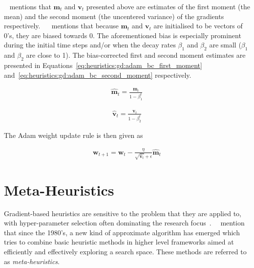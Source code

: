 \citeauthor{ref:ruder:2016}~\cite{ref:ruder:2016} mentions that $\boldsymbol{m}_{t}$ and $\boldsymbol{v}_{t}$ presented above are estimates of the first moment (the mean) and the second moment (the uncentered variance) of the gradients respectively. ~\citeauthor{ref:kingma:2014}~\cite{ref:kingma:2014} mentions that because $\boldsymbol{m}_{t}$ and $\boldsymbol{v}_{t}$ are initialised to be vectors of 0's, they are biased towards 0. The aforementioned bias is especially prominent during the initial time steps and/or when the decay rates $\beta_{1}$ and $\beta_{2}$ are small ($\beta_{1}$ and $\beta_{2}$ are close to 1). The bias-corrected first and second moment estimates are presented in Equations~\eqref{eq:heuristics:gd:adam_bc_first_moment} and~\eqref{eq:heuristics:gd:adam_bc_second_moment} respectively.

\begin{equation}
	\label{eq:heuristics:gd:adam_bc_first_moment}
	\begin{split}
		\hat{\boldsymbol{m}}_{t} = \frac{\boldsymbol{m}_{t}}{1 - \beta^{t}_{1}}
	\end{split}
\end{equation}

\begin{equation}
	\label{eq:heuristics:gd:adam_bc_second_moment}
	\begin{split}
		\hat{\boldsymbol{v}}_{t} = \frac{\boldsymbol{v}_{t}}{1 - \beta^{t}_{2}}
	\end{split}
\end{equation}

The \acs{Adam} weight update rule is then given as

\begin{equation}
	\label{eq:heuristics:gd:adam}
	\begin{split}
		\boldsymbol{w}_{t+1} = \boldsymbol{w}_{t} - \frac{\eta}{\sqrt{\hat{\boldsymbol{v}}_{t}} + \epsilon}\hat{\boldsymbol{m}}_{t}
	\end{split}
\end{equation}

\section{Meta-Heuristics}\label{sec:heuristics:mh}

Gradient-based heuristics are sensitive to the problem that they are applied to, with hyper-parameter selection often dominating the research focus~\cite{ref:bengio:2000, ref:feurer:2019}.~\citeauthor{ref:blum:2003}~\cite{ref:blum:2003} mention that since the 1980's, a new kind of approximate algorithm has emerged which tries to combine basic heuristic methods in higher level frameworks aimed at efficiently and effectively exploring a search space. These methods are referred to as \textit{meta-heuristics}.

